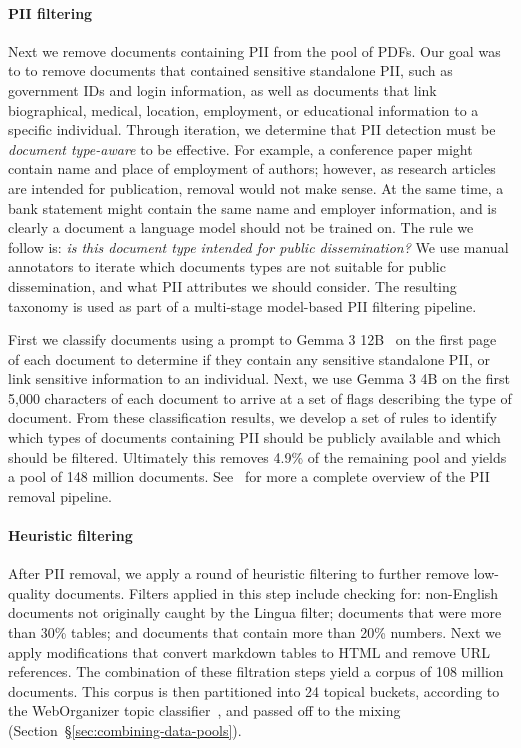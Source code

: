 \documentclass[table]{ai2style/ai2}
\begin{document}
\paragraph{PII filtering}
Next we remove documents containing PII from the pool of PDFs. Our goal was to to remove documents that contained sensitive standalone PII, such as government IDs and login information, as well as documents that link biographical, medical, location, employment, or educational information to a specific individual.
Through iteration, we determine that PII detection must be \textit{document type-aware} to be effective.
For example, a conference paper might contain name and place of employment of authors; however, as research articles are intended for publication, removal would not make sense. 
At the same time, a bank statement might contain the same name and employer information, and is clearly a document a language model should not be trained on. 
The rule we follow is: \textit{is this document type intended for public dissemination?}
We use manual annotators to iterate which documents types are not suitable for public dissemination, and what PII attributes we should consider. 
The resulting taxonomy is used as part of a multi-stage model-based PII filtering pipeline.

First we classify documents using a prompt to Gemma 3 12B~\citep{team2025gemma3} on the first page of each document to determine if they contain any sensitive standalone PII, or link sensitive information to an individual. Next, we use Gemma 3 4B on the first 5,000 characters of each document to arrive at a set of flags describing the type of document. From these classification results, we develop a set of rules to identify which types of documents containing PII should be publicly available and which should be filtered. Ultimately this removes 4.9\% of the remaining pool and yields a pool of 148 million documents. See~\citet{poznanski2025olmocr} for more a complete overview of the PII removal pipeline.

\paragraph{Heuristic filtering}
After PII removal, we apply a round of heuristic filtering to further remove low-quality documents. Filters applied in this step include checking for: non-English documents not originally caught by the Lingua filter; documents that were more than 30\% tables; and documents that contain more than 20\% numbers. Next we apply modifications that convert markdown tables to HTML and remove URL references. 
The combination of these filtration steps yield a corpus of 108 million documents. This corpus is then partitioned into 24 topical buckets, according to the WebOrganizer topic classifier~\citep{weborganizer}, and passed off to the mixing (Section~\S\ref{sec:combining-data-pools}).
\end{document}
